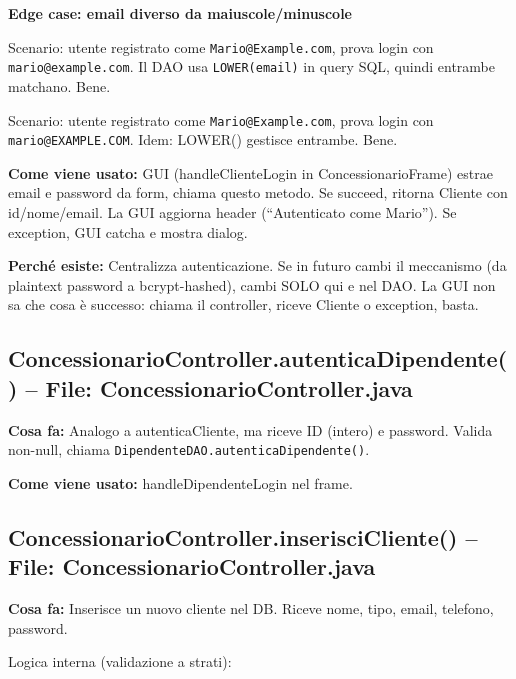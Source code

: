 \documentclass[12pt,a4paper]{article}
\begin{document}
\textbf{Edge case: email diverso da maiuscole/minuscole}

Scenario: utente registrato come \texttt{Mario@Example.com}, prova login con \texttt{mario@example.com}.
Il DAO usa \texttt{LOWER(email)} in query SQL, quindi entrambe matchano. Bene.

Scenario: utente registrato come \texttt{Mario@Example.com}, prova login con \texttt{mario@EXAMPLE.COM}.
Idem: LOWER() gestisce entrambe. Bene.

\textbf{Come viene usato:}
GUI (handleClienteLogin in ConcessionarioFrame) estrae email e password da form, chiama questo metodo.
Se succeed, ritorna Cliente con id/nome/email. La GUI aggiorna header (``Autenticato come Mario'').
Se exception, GUI catcha e mostra dialog.

\textbf{Perché esiste:}
Centralizza autenticazione. Se in futuro cambi il meccanismo (da plaintext password a bcrypt-hashed), cambi SOLO qui e nel DAO.
La GUI non sa che cosa è successo: chiama il controller, riceve Cliente o exception, basta.

\subsection{ConcessionarioController.autenticaDipendente() -- File: ConcessionarioController.java}

\textbf{Cosa fa:}
Analogo a autenticaCliente, ma riceve ID (intero) e password.
Valida non-null, chiama \texttt{DipendenteDAO.autenticaDipendente()}.

\textbf{Come viene usato:}
handleDipendenteLogin nel frame.

\subsection{ConcessionarioController.inserisciCliente() -- File: ConcessionarioController.java}

\textbf{Cosa fa:}
Inserisce un nuovo cliente nel DB. Riceve nome, tipo, email, telefono, password.

Logica interna (validazione a strati):
\end{document}
